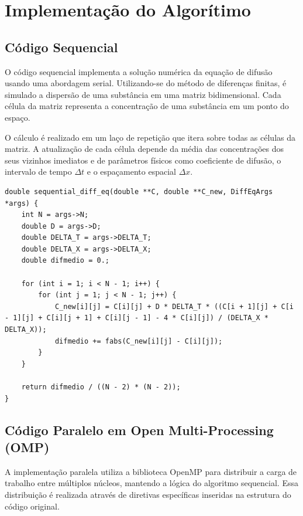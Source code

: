 \documentclass[12pt]{article}
\begin{document}
\section{Implementação do Algorítimo}

\subsection{Código Sequencial}

O código sequencial implementa a solução numérica da equação de difusão usando
uma abordagem serial. Utilizando-se do método de diferenças finitas, é simulado
a dispersão de uma substância em uma matriz bidimensional. Cada célula da
matriz representa a concentração de uma substância em um ponto do espaço.

O cálculo é realizado em um laço de repetição que itera sobre todas as células
da matriz. A atualização de cada célula depende da média das concentrações dos
seus vizinhos imediatos e de parâmetros físicos como coeficiente de difusão, o
intervalo de tempo $\Delta t$ e o espaçamento espacial $\Delta x$.

\begin{lstlisting}[style=CStyle, caption={Código sequencial da para cálculo da difusão, que será utilizado como base para as demais implementações.}, label={cod:seq}]
double sequential_diff_eq(double **C, double **C_new, DiffEqArgs *args) {
    int N = args->N;
    double D = args->D;
    double DELTA_T = args->DELTA_T;
    double DELTA_X = args->DELTA_X;
    double difmedio = 0.;

    for (int i = 1; i < N - 1; i++) {
        for (int j = 1; j < N - 1; j++) {
            C_new[i][j] = C[i][j] + D * DELTA_T * ((C[i + 1][j] + C[i - 1][j] + C[i][j + 1] + C[i][j - 1] - 4 * C[i][j]) / (DELTA_X * DELTA_X));
            difmedio += fabs(C_new[i][j] - C[i][j]);
        }
    }

    return difmedio / ((N - 2) * (N - 2));
}
\end{lstlisting}

\subsection{Código Paralelo em Open Multi-Processing (OMP)}

A implementação paralela utiliza a biblioteca OpenMP para distribuir a carga de
trabalho entre múltiplos núcleos, mantendo a lógica do algoritmo sequencial.
Essa distribuição é realizada através de diretivas específicas inseridas na
estrutura do código original.
\end{document}
